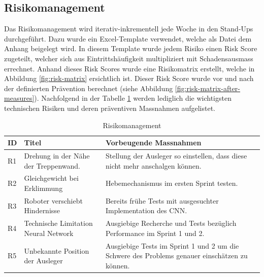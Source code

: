 \subsection{Risikomanagement}
\label{sec:risikomanagement}
Das Risikomanagement wird iterativ-inkrementell jede Woche in den Stand-Ups durchgeführt. Dazu wurde ein Excel-Template verwendet, welche als Datei dem Anhang beigelegt wird. In diesem Template wurde jedem Risiko einen Risk Score zugeteilt, welcher sich aus Eintrittshäufigkeit multipliziert mit Schadensausmass errechnet. Anhand dieses Risk Scores wurde eine Risikomatrix erstellt, welche in Abbildung \ref{fig:risk-matrix} ersichtlich ist. Dieser Risk Score wurde vor und nach der definierten Prävention berechnet (siehe Abbildung \ref{fig:risk-matrix-after-measures}). Nachfolgend in der Tabelle \ref{tab:risikomanagement} werden lediglich die wichtigsten technischen Risiken und deren präventiven Massnahmen aufgelistet. 

\begin{center}
\begin{table}[H]
    \begin{tabularx}{\textwidth}{|l|X|X|}
        \hline
        \textbf{ID} & \textbf{Titel} & \textbf{Vorbeugende Massnahmen} \\ \hline
        R1 & Drehung in der Nähe der Treppenwand. & Stellung der Ausleger so einstellen, dass diese nicht mehr anschalgen können. \\ \hline
        R2 & Gleichgewicht bei Erklimmung & Hebemechanismus im ersten Sprint testen. \\ \hline
        R3 & Roboter verschiebt Hindernisse & Bereits frühe Tests mit ausgesuchter Implementation des CNN. \\ \hline 
        R4 & Technische Limitation Neural Network & Ausgiebige Recherche und Tests bezüglich Performance im Sprint 1 und 2.\\ \hline
        R5 & Unbekannte Position der Ausleger & Ausgiebige Tests im Sprint 1 und 2 um die Schwere des Problems genauer einschätzen zu können. \\ \hline
    \end{tabularx}
    \caption{Risikomanagement}
    \label{tab:risikomanagement}
\end{table}
\end{center}

